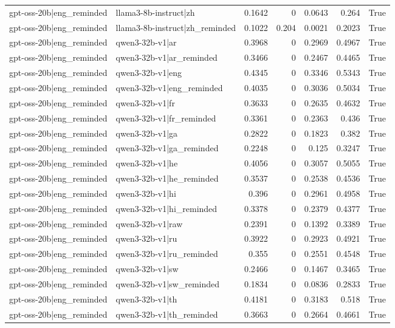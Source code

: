 \begin{table}
\begin{tabular}{l l r r r r l}
gpt-oss-20b|eng_reminded & llama3-8b-instruct|zh & 0.1642 & 0 & 0.0643 & 0.264 & True \\
gpt-oss-20b|eng_reminded & llama3-8b-instruct|zh_reminded & 0.1022 & 0.204 & 0.0021 & 0.2023 & True \\
gpt-oss-20b|eng_reminded & qwen3-32b-v1|ar & 0.3968 & 0 & 0.2969 & 0.4967 & True \\
gpt-oss-20b|eng_reminded & qwen3-32b-v1|ar_reminded & 0.3466 & 0 & 0.2467 & 0.4465 & True \\
gpt-oss-20b|eng_reminded & qwen3-32b-v1|eng & 0.4345 & 0 & 0.3346 & 0.5343 & True \\
gpt-oss-20b|eng_reminded & qwen3-32b-v1|eng_reminded & 0.4035 & 0 & 0.3036 & 0.5034 & True \\
gpt-oss-20b|eng_reminded & qwen3-32b-v1|fr & 0.3633 & 0 & 0.2635 & 0.4632 & True \\
gpt-oss-20b|eng_reminded & qwen3-32b-v1|fr_reminded & 0.3361 & 0 & 0.2363 & 0.436 & True \\
gpt-oss-20b|eng_reminded & qwen3-32b-v1|ga & 0.2822 & 0 & 0.1823 & 0.382 & True \\
gpt-oss-20b|eng_reminded & qwen3-32b-v1|ga_reminded & 0.2248 & 0 & 0.125 & 0.3247 & True \\
gpt-oss-20b|eng_reminded & qwen3-32b-v1|he & 0.4056 & 0 & 0.3057 & 0.5055 & True \\
gpt-oss-20b|eng_reminded & qwen3-32b-v1|he_reminded & 0.3537 & 0 & 0.2538 & 0.4536 & True \\
gpt-oss-20b|eng_reminded & qwen3-32b-v1|hi & 0.396 & 0 & 0.2961 & 0.4958 & True \\
gpt-oss-20b|eng_reminded & qwen3-32b-v1|hi_reminded & 0.3378 & 0 & 0.2379 & 0.4377 & True \\
gpt-oss-20b|eng_reminded & qwen3-32b-v1|raw & 0.2391 & 0 & 0.1392 & 0.3389 & True \\
gpt-oss-20b|eng_reminded & qwen3-32b-v1|ru & 0.3922 & 0 & 0.2923 & 0.4921 & True \\
gpt-oss-20b|eng_reminded & qwen3-32b-v1|ru_reminded & 0.355 & 0 & 0.2551 & 0.4548 & True \\
gpt-oss-20b|eng_reminded & qwen3-32b-v1|sw & 0.2466 & 0 & 0.1467 & 0.3465 & True \\
gpt-oss-20b|eng_reminded & qwen3-32b-v1|sw_reminded & 0.1834 & 0 & 0.0836 & 0.2833 & True \\
gpt-oss-20b|eng_reminded & qwen3-32b-v1|th & 0.4181 & 0 & 0.3183 & 0.518 & True \\
gpt-oss-20b|eng_reminded & qwen3-32b-v1|th_reminded & 0.3663 & 0 & 0.2664 & 0.4661 & True \\

\end{tabular}
\end{table}
